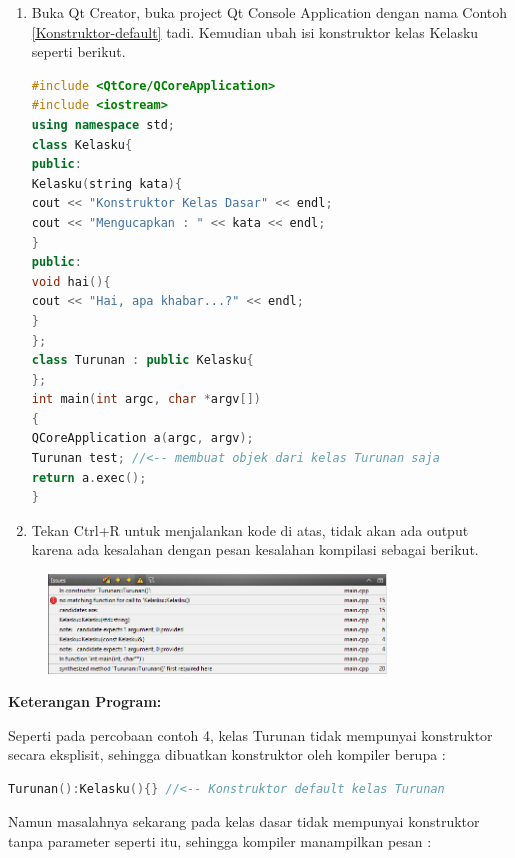 \begin{enumerate}
\def\labelenumi{\arabic{enumi}.}
\item
  Buka Qt Creator, buka project Qt Console Application dengan nama
  Contoh \ref{Konstruktor-default} tadi. Kemudian ubah isi konstruktor kelas Kelasku seperti
  berikut.

\begin{lstlisting}[language=c++, caption=Konstruktor default kelas turunan memanggil konstruktor kelas dasar, label=Konstruktor-default-kelas-turunan-memanggil-konstruktor-kelas-dasar]
#include <QtCore/QCoreApplication>
#include <iostream>
using namespace std;
class Kelasku{
public:
Kelasku(string kata){
cout << "Konstruktor Kelas Dasar" << endl;
cout << "Mengucapkan : " << kata << endl;
}
public:
void hai(){
cout << "Hai, apa khabar...?" << endl;
}
};
class Turunan : public Kelasku{
};
int main(int argc, char *argv[])
{
QCoreApplication a(argc, argv);
Turunan test; //<-- membuat objek dari kelas Turunan saja
return a.exec();
}
\end{lstlisting}
\item
  Tekan Ctrl+R untuk menjalankan kode di atas, tidak akan ada output
  karena ada kesalahan dengan pesan kesalahan kompilasi sebagai berikut.
\end{enumerate}

\begin{figure}[htbp]
\centering
\includegraphics[width=0.8\textwidth]{images/capture7-2.png}

\end{figure}

\textbf{Keterangan Program:}

Seperti pada percobaan contoh 4, kelas Turunan tidak mempunyai
konstruktor secara eksplisit, sehingga dibuatkan konstruktor oleh
kompiler berupa :

\begin{lstlisting}[language=c++, numbers=none]
Turunan():Kelasku(){} //<-- Konstruktor default kelas Turunan
\end{lstlisting}

Namun masalahnya sekarang pada kelas dasar tidak mempunyai konstruktor
tanpa parameter seperti itu, sehingga kompiler manampilkan pesan :

